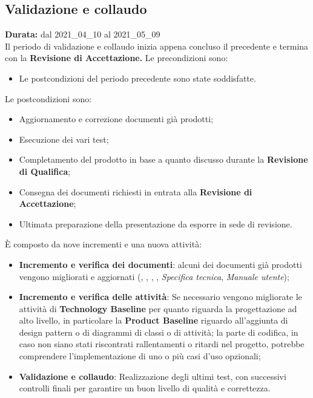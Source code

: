 \subsection{Validazione e collaudo}
\label{validazione_e_collaudo}
\textbf{Durata:} dal 2021\_04\_10 al 2021\_05\_09\\
Il periodo di validazione e collaudo inizia appena concluso il precedente e termina con la \textbf{Revisione di Accettazione.}
Le precondizioni sono:
\begin{itemize}
    \item Le postcondizioni del periodo precedente sono state soddisfatte.
\end{itemize}
Le postcondizioni sono:
\begin{itemize}
    \item Aggiornamento e correzione documenti già prodotti;
    \item Esecuzione dei vari test;
    \item Completamento del prodotto in base a quanto discusso durante la \textbf{Revisione di Qualifica};
    \item Consegna dei documenti richiesti in entrata alla \textbf{Revisione di Accettazione};
    \item Ultimata preparazione della presentazione da esporre in sede di revisione.
\end{itemize}
È composto da nove incrementi e una nuova attività:
\begin{itemize}
    \item \textbf{Incremento e verifica dei documenti}: alcuni dei documenti già prodotti vengono migliorati e aggiornati ({\NdP}, {\PdP}, {\Glossario}, {\PdQ}, \textit{Specifica tecnica}, \textit{Manuale utente}); 
    \item \textbf{Incremento e verifica delle attività}: Se necessario vengono migliorate le attività di \textbf{Technology Baseline} per quanto riguarda la progettazione ad alto livello, in particolare la \textbf{Product Baseline} riguardo all'aggiunta di design pattern o di diagrammi di classi o di attività; la parte di codifica, in caso non siano stati riscontrati rallentamenti o ritardi nel progetto, potrebbe comprendere l'implementazione di uno o più casi d'uso opzionali;
    \item \textbf{Validazione e collaudo}: Realizzazione degli ultimi test, con successivi controlli finali per garantire un buon livello di qualità e correttezza.
\end{itemize}
\newpage
